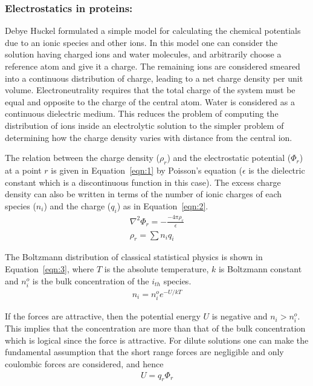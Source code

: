 
\clearpage
\pagebreak
\clearpage
\subsubsection{\bf Electrostatics in proteins:}
Debye H$\ddot{u}$ckel formulated a simple model for calculating the chemical potentials due to an ionic species
and other ions. In this model one can consider the solution having charged ions and water molecules, and arbitrarily
choose a reference atom and give it a charge. The remaining ions are considered smeared into a continuous
distribution of charge, leading to a net charge density per unit volume. Electroneutrality requires
that the total charge of the system must be equal and opposite to the charge of the central atom. Water
is considered as a continuous dielectric medium. This reduces the problem of computing the 
distribution of ions inside an electrolytic solution to the simpler problem of 
determining how the charge density varies with distance from the central ion.


The relation between the charge density ($\rho_{r}$) and the electrostatic potential ($\Phi_{r}$) at a point $r$  is given in Equation~\ref{eqn:1} by Poisson's equation ($\epsilon$ is the dielectric constant which is a discontinuous function in this case). The excess charge density can also be written in terms of the number of ionic charges of each species ($n_{i}$) and the charge ($q_{i}$) as in Equation~\ref{eqn:2}.
\begin{align}
\label{eqn:1}      \nabla^{2}\Phi_{r} = - \frac{-4\pi\rho_{r}}{\epsilon}  \\
\label{eqn:2}      \rho_{r} = \sum n_{i}q_{i} 
\end{align}



The Boltzmann distribution of classical statistical physics is shown in Equation~\ref{eqn:3}, where $T$ is the absolute temperature, $k$ is Boltzmann constant and $n_{i}^{o}$ is the bulk concentration of the $i_{th}$ species. 
\begin{align}
\label{eqn:3}  n_{i} = n_{i}^{o}e^{-U/kT} 
\end{align}

If the forces are attractive, then the potential energy $U$ is negative and  $n_{i} > n_{i}^{o}$. This implies that the concentration are more than that of the bulk concentration which is logical since the force is attractive.
For dilute solutions one can make the fundamental assumption that the short range forces are negligible and only coulombic forces are considered, and hence
\begin{align}
\label{eqn:4}  U = q_{r}\Phi_{r}
\end{align}


